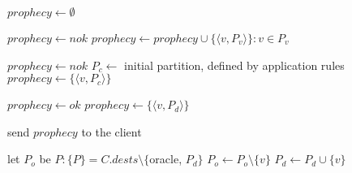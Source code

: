 \begin{algorithm}[h!]
\small

\begin{distribalgo}[1]

\vspace{1.5mm}


    \vspace{1.5mm}


    \vspace{1.5mm}

            \STATE $prophecy \leftarrow \emptyset$

                    \STATE $prophecy \leftarrow nok$
                \ELSE
                        \STATE $prophecy \leftarrow prophecy \cup \{\langle v, P_v \rangle \}:v \in P_v$
                    \ENDFOR
                \ENDIF

                    \STATE $prophecy \leftarrow nok$
                \ELSE
                    \STATE $P_c \leftarrow$ initial partition, defined by application rules
                    \STATE $prophecy \leftarrow \{\langle v, P_c \rangle \}$
                \ENDIF

                    \STATE $prophecy \leftarrow ok$
                \ELSE
                    \STATE $prophecy \leftarrow \{\langle v, P_d \rangle \}$
                \ENDIF
                
            \ENDIF
            
            \STATE send $prophecy$ to the client

        \vspace{1.5mm}

            \STATE let $P_o$ be $P : \{P\} = C.dests \setminus \{$oracle, $P_d\}$
                \STATE $P_o \leftarrow P_o \setminus \{v\}$
                \STATE $P_d \leftarrow P_d \cup      \{v\}$
            \ENDIF


\end{distribalgo}
\end{algorithm}

